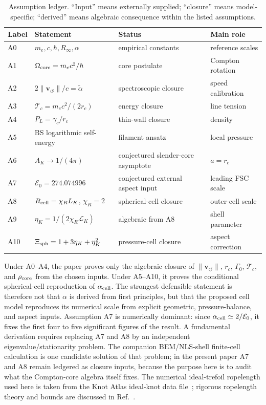 \documentclass[aps,pra,preprint,longbibliography,nofootinbib]{revtex4-2}
\newcommand{\vnorm}{\lVert\mathbf{v}_{\!\boldsymbol{\circlearrowleft}}\rVert} %
\newcommand{\Tc}{\mathcal{T}_c}                  %
\begin{document}
\begin{table}[h]
\centering
\caption{Assumption ledger.  ``Input'' means externally supplied; ``closure''
means model-specific; ``derived'' means algebraic consequence within the
listed assumptions.}
\label{tab:app_assumption_ledger}
\scriptsize
\begin{tabular}{@{}llll@{}}
\toprule
Label & Statement & Status & Main role \\
\midrule
A0 & $m_e,c,\hbar,R_\infty,\alpha$ & empirical constants & reference scales \\
A1 & $\Omega_{\rm core}=m_ec^2/\hbar$ & core postulate & Compton rotation \\
A2 & $2\vnorm/c=\tilde\alpha$ & spectroscopic closure & speed calibration \\
A3 & $\Tc=m_ec^2/(2r_c)$ & energy closure & line tension \\
A4 & $P_L=\gamma_c/r_c$ & thin-wall closure & density \\
A5 & BS logarithmic self-energy & filament ansatz & local pressure \\
A6 & $A_K\to1/(4\pi)$ & conjectured slender-core asymptote & $a=r_c$ \\
A7 & $\mathcal E_0=274.074996$ & conjectured external aspect input & leading FSC scale \\
A8 & $R_{\rm cell}=\chi_R L_K$, $\chi_R=2$ & spherical-cell closure & outer-cell scale \\
A9 & $\eta_K=1/(2\chi_R\mathcal L_K)$ & algebraic from A8 & shell parameter \\
A10 & $\Xi_{\rm sph}=1+3\eta_K+\eta_K^2$ & pressure-cell closure & aspect correction \\
\bottomrule
\end{tabular}
\end{table}

Under A0--A4, the paper proves only the algebraic closure of
$\vnorm$, $r_c$, $\Gamma_0$, $\Tc$, and $\rho_{\rm core}$ from the chosen
inputs.  Under A5--A10, it proves the conditional spherical-cell
reproduction of $\alpha_{\rm cell}$.  The strongest defensible statement is
therefore not that $\alpha$ is derived from first principles, but that the
proposed cell model reproduces its numerical scale from explicit geometric,
pressure-balance, and aspect inputs.  Assumption A7 is numerically
dominant: since $\alpha_{\rm cell}\simeq2/\mathcal E_0$, it fixes the first
four to five significant figures of the result.  A fundamental derivation requires replacing A7 and A8 by an independent
eigenvalue/stationarity problem.  The companion BEM/NLS-shell finite-cell
calculation is one candidate solution of that problem; in the present paper A7
and A8 remain ledgered as closure inputs, because the purpose here is to audit
what the Compton-core algebra itself fixes.  The numerical ideal-trefoil
ropelength used here is taken from
the Knot Atlas ideal-knot data file~\cite{KnotAtlasIdeal}; rigorous
ropelength theory and bounds are discussed in Ref.~\cite{Cantarella2002}.
\end{document}
